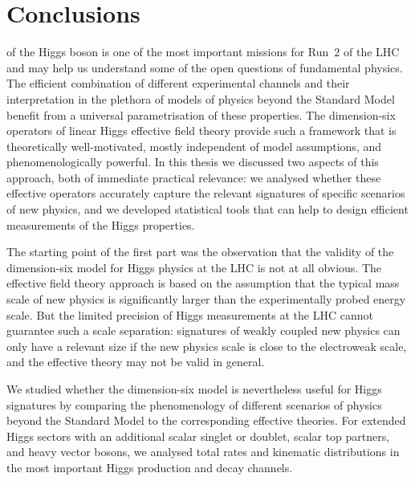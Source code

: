 
 
\chapter{Conclusions}
\label{chapter:conclusions}

 of the Higgs boson is one of
the most important missions for Run~2 of the LHC and may help us
understand some of the open questions of fundamental physics. The
efficient combination of different experimental channels and their
interpretation in the plethora of models of physics beyond the
Standard Model benefit from a universal parametrisation of these
properties. The dimension-six operators of linear Higgs effective
field theory provide such a framework that is theoretically
well-motivated, mostly independent of model assumptions, and
phenomenologically powerful. In this thesis we discussed two aspects
of this approach, both of immediate practical relevance: we analysed
whether these effective operators accurately capture the relevant
signatures of specific scenarios of new physics, and we developed
statistical tools that can help to design efficient measurements of
the Higgs properties.

\newparagraph
%
The starting point of the first part was the observation that the
validity of the dimension-six model for Higgs physics at the LHC is
not at all obvious. The effective field theory approach is based on
the assumption that the typical mass scale of new physics is
significantly larger than the experimentally probed energy scale. But
the limited precision of Higgs measurements at the LHC cannot
guarantee such a scale separation: signatures of weakly coupled new
physics can only have a relevant size if the new physics scale is
close to the electroweak scale, and the effective theory may not be
valid in general.

We studied whether the dimension-six model is nevertheless useful for
Higgs signatures
by comparing the phenomenology of different scenarios of physics
beyond the Standard Model to the corresponding effective theories. For
extended Higgs sectors with an additional scalar singlet or doublet,
scalar top partners, and heavy vector bosons, we analysed total rates
and kinematic distributions in the most important Higgs production and
decay channels.

